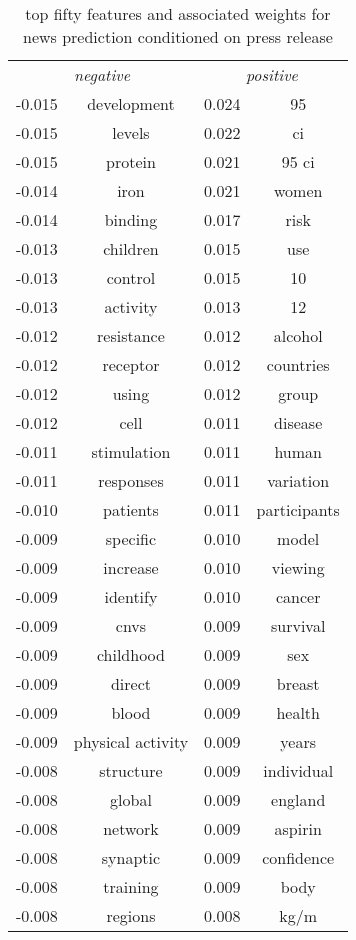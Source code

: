\documentclass[paper=a4, fontsize=11pt]{scrartcl} %
\numberwithin{equation}{section} %
\numberwithin{figure}{section} %
\numberwithin{table}{section} %
\begin{document}
\begin{table}
\caption{top fifty features and associated weights for news prediction conditioned on press release}
            \begin{tabular}{l c | l c}

        
\multicolumn{2}{c}{\emph{negative}} & \multicolumn{2}{c}{\emph{positive}} \\
-0.015 & development & 0.024 & 95 \\
-0.015 & levels & 0.022 & ci \\
-0.015 & protein & 0.021 & 95 ci \\
-0.014 & iron & 0.021 & women \\
-0.014 & binding & 0.017 & risk \\
-0.013 & children & 0.015 & use \\
-0.013 & control & 0.015 & 10 \\
-0.013 & activity & 0.013 & 12 \\
-0.012 & resistance & 0.012 & alcohol \\
-0.012 & receptor & 0.012 & countries \\
-0.012 & using & 0.012 & group \\
-0.012 & cell & 0.011 & disease \\
-0.011 & stimulation & 0.011 & human \\
-0.011 & responses & 0.011 & variation \\
-0.010 & patients & 0.011 & participants \\
-0.009 & specific & 0.010 & model \\
-0.009 & increase & 0.010 & viewing \\
-0.009 & identify & 0.010 & cancer \\
-0.009 & cnvs & 0.009 & survival \\
-0.009 & childhood & 0.009 & sex \\
-0.009 & direct & 0.009 & breast \\
-0.009 & blood & 0.009 & health \\
-0.009 & physical activity & 0.009 & years \\
-0.008 & structure & 0.009 & individual \\
-0.008 & global & 0.009 & england \\
-0.008 & network & 0.009 & aspirin \\
-0.008 & synaptic & 0.009 & confidence \\
-0.008 & training & 0.009 & body \\
-0.008 & regions & 0.008 & kg/m \\

\end{tabular}
\end{table}
\end{document}
